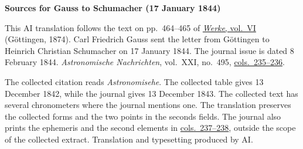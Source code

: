 \clearpage\thispagestyle{empty}
\begin{center}\textbf{Sources for Gauss to Schumacher (17 January 1844)}\end{center}
\noindent This AI translation follows the text on pp.~464--465 of \href{https://gdz.sub.uni-goettingen.de/id/PPN236007467}{\textit{Werke}, vol.~VI} (Göttingen, 1874). Carl Friedrich Gauss sent the letter from Göttingen to Heinrich Christian Schumacher on 17 January 1844. The journal issue is dated 8 February 1844. \textit{Astronomische Nachrichten}, vol.~XXI, no.~495, \href{https://api.digitale-sammlungen.de/iiif/image/v2/bsb10049446_00126/full/1800,/0/default.jpg}{cols.~235--236}.
\par\smallskip\noindent The collected citation reads \textit{Astronomisehe}. The collected table gives 13 December 1842, while the journal gives 13 December 1843. The collected text has several chronometers where the journal mentions one. The translation preserves the collected forms and the two points in the seconds fields. The journal also prints the ephemeris and the second elements in \href{https://api.digitale-sammlungen.de/iiif/image/v2/bsb10049446_00127/full/1800,/0/default.jpg}{cols.~237--238}, outside the scope of the collected extract. Translation and typesetting produced by AI.
\clearpage
